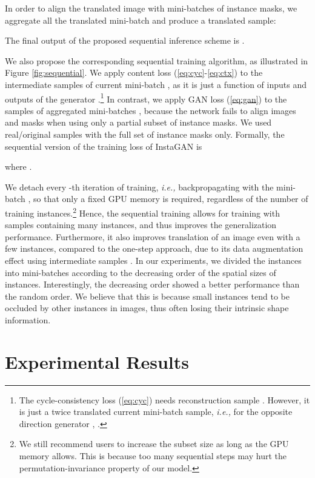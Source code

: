 \documentclass{article} \usepackage{iclr2019_conference,times}
\begin{document}
In order to align the translated  image with mini-batches of instance masks, we aggregate all the translated mini-batch and produce a translated sample:

The final output of the proposed sequential inference scheme is .




We also propose the corresponding sequential training algorithm, as illustrated in Figure \ref{fig:sequential}.
We apply content loss (\ref{eq:cyc}-\ref{eq:ctx}) to the intermediate samples  of current mini-batch ,
as it is just a function of inputs and outputs of the generator .\footnote{
The cycle-consistency loss (\ref{eq:cyc}) needs reconstruction sample .
However, it is just a twice translated current mini-batch sample,
\textit{i.e.,} for the opposite direction generator , .}
In contrast, we apply GAN loss (\ref{eq:gan}) to the samples of aggregated mini-batches ,
because the network fails to align images and masks when using only a partial subset of instance masks.
We used real/original samples  with the full set of instance masks only.
Formally, the sequential version of the training loss of InstaGAN is

where .

We detach every -th iteration of training,
\textit{i.e.,} backpropagating with the mini-batch ,
so that only a fixed GPU memory is required, regardless of the number of training instances.\footnote{
We still recommend users to increase the subset size as long as the GPU memory allows.
This is because too many sequential steps may hurt the permutation-invariance property of our model.}
Hence, the sequential training allows for training with samples containing many instances,
and thus improves the generalization performance.
Furthermore, it also improves translation of an image even with a few instances, compared to the one-step approach, due to its data augmentation effect using intermediate samples .
In our experiments, we divided the instances into mini-batches  
according to the decreasing order of the spatial sizes of instances.
Interestingly, the decreasing order showed a better performance than the random order.
We believe that this is because small instances tend to be occluded by other instances in images, thus often losing their intrinsic shape information. 

%
 \vspace{-0.05in}
\section{Experimental Results}
\vspace{-0.05in}
\label{sec:exp}
\end{document}
